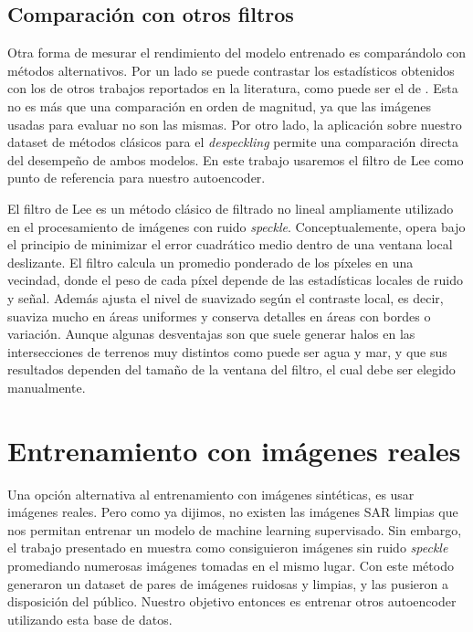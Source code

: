 \subsection{Comparación con otros filtros}

Otra forma de mesurar el rendimiento del modelo entrenado es comparándolo con métodos alternativos. Por un lado se puede contrastar los estadísticos obtenidos con los de otros trabajos reportados en la literatura, como puede ser el de \cite{chan2022entropy}. Esta no es más que una comparación en orden de magnitud, ya que las imágenes usadas para evaluar no son las mismas. Por otro lado, la aplicación sobre nuestro dataset de métodos clásicos para el \emph{despeckling} permite una comparación directa del desempeño de ambos modelos. En este trabajo usaremos el filtro de Lee como punto de referencia para nuestro autoencoder.

El filtro de Lee \cite{lee1980digital} es un método clásico de filtrado no lineal ampliamente utilizado en el procesamiento de imágenes con ruido \emph{speckle}. Conceptualemente, opera bajo el principio de minimizar el error cuadrático medio dentro de una ventana local deslizante. El filtro calcula un promedio ponderado de los píxeles en una vecindad, donde el peso de cada píxel depende de las estadísticas locales de ruido y señal. Además ajusta el nivel de suavizado según el contraste local, es decir, suaviza mucho en áreas uniformes y conserva detalles en áreas con bordes o variación. Aunque algunas desventajas son que suele generar halos en las intersecciones de terrenos muy distintos como puede ser agua y mar, y que sus resultados dependen del tamaño de la ventana del filtro, el cual debe ser elegido manualmente.

\section{Entrenamiento con imágenes reales}

Una opción alternativa al entrenamiento con imágenes sintéticas, es usar imágenes reales. Pero como ya dijimos, no existen las imágenes SAR limpias que nos permitan entrenar un modelo de machine learning supervisado. Sin embargo, el trabajo presentado en \cite{vasquez2024labeled} muestra como consiguieron imágenes sin ruido \emph{speckle} promediando numerosas imágenes tomadas en el mismo lugar. Con este método generaron un dataset de pares de imágenes ruidosas y limpias, y las pusieron a disposición del público. Nuestro objetivo entonces es entrenar otros autoencoder utilizando esta base de datos.

